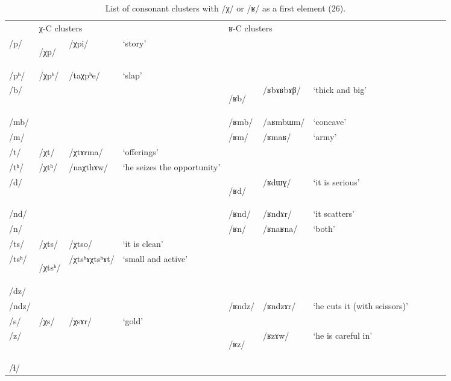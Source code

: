 \documentclass[12pt]{article}
\newcommand{\ipa}[1]{\mbox{\phon/#1/}}
\newcommand{\ipab}[1]{{\phon#1}}
\newcommand{\deux}[1]{\ipa{#1}\addtocounter{2clusters}{1}}
\newcommand{\tib}[1]{\cellcolor{lightgray}\textbf{#1}}
\newcommand{\idph}[1]{\cellcolor{gray}\textbf{#1}}
\begin{document}
  \begin{landscape} 
  \begin{longtable}{lllllllllll}
 \caption{List of consonant clusters with  \ipa{χ} or \ipa{ʁ} as a first element (26).} \label{preinit.X.R} \\
\toprule
 & \multicolumn{3}{l}{\ipab{χ}-C clusters} & \multicolumn{3}{l}{\ipab{ʁ}-C clusters}  \\
\ipa{p}  & 		 \deux{χp} \tib{}  & 	 \ipa{χpi}  & 	 `story'  & 	  & 	  & 	 \\      
\ipa{pʰ}  & 		 \deux{χpʰ}  & 	 \ipa{taχpʰe}  & 	 `slap'  & 	  & 	  & 	 \\     
\ipa{b}  & 		  & 	  & 	  & 	\deux{ʁb}  \idph{}  & 	 \ipa{ʁbɤʁbɤβ}  & 	 `thick and big' \\   
\ipa{mb}  & 		  & 	  & 	  & 	 \deux{ʁmb}  & 	 \ipa{aʁmbɯm}  & 	 `concave' \\  
\ipa{m}  & 		  & 	  & 	  & 	 \deux{ʁm}  & 	 \ipa{ʁmaʁ}  & 	 `army' \\     
\ipa{t}  & 		 \deux{χt}  & 	 \ipa{χtɤrma}  & 	 `offerings'  & 	  & 	  & 	 \\     
\ipa{tʰ}  & 		 \deux{χtʰ}  & 	 \ipa{naχthɤw}  & 	 `he seizes the opportunity'  & 	  & 	  & 	\\     
\ipa{d}  & 		  & 	  & 	  & 	 \deux{ʁd} \tib{}  & 	 \ipa{ʁdɯɣ}  & 	 `it is serious' \\     
\ipa{nd}  & 		  & 	  & 	  & 	 \deux{ʁnd}  & 	 \ipa{ʁndɤr}  & 	 `it scatters' \\     
\ipa{n}  & 		  & 	  & 	  & 	 \deux{ʁn}  & 	 \ipa{ʁnaʁna}  & 	 `both' \\     
\ipa{ts}  & 		 \deux{χts}  & 	 \ipa{χtso}  & 	 `it is clean'  & 	  & 	  & 	 \\     
\ipa{tsʰ}  & 		 \deux{χtsʰ} \idph{}  & 	 \ipa{χtsʰɤχtsʰɤt}  & 	 `small and active'  & 	  & 	  & 	\\     
\ipa{dz}  & 		  & 	  & 	  & 	  & 	  & 	 \\    
\ipa{ndz}  & 		  & 	  & 	  & 	 \deux{ʁndz}  & 	 \ipa{ʁndzɤr}  & 	 `he cuts it (with scissors)' \\     
\ipa{s}  & 		 \deux{χs}  & 	 \ipa{χsɤr}  & 	 `gold'  & 	  & 	  & 	\\     
\ipa{z}  & 		  & 	  & 	  & 	 \deux{ʁz}  \tib{}  & 	 \deux{ʁzɤw}  & 	 `he is careful in' \\      
\ipa{ɬ}  & 		  & 	  & 	  & 	  & 	  & 	 \\    

\end{longtable}
\end{landscape}
\end{document}
